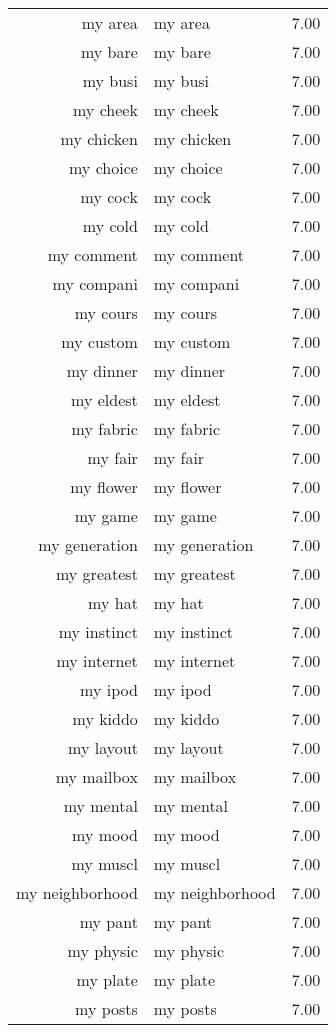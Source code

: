 \begin{table}[ht]
\begin{tabular}{rlr}
  my area & my area & 7.00 \\ 
  my bare & my bare & 7.00 \\ 
  my busi & my busi & 7.00 \\ 
  my cheek & my cheek & 7.00 \\ 
  my chicken & my chicken & 7.00 \\ 
  my choice & my choice & 7.00 \\ 
  my cock & my cock & 7.00 \\ 
  my cold & my cold & 7.00 \\ 
  my comment & my comment & 7.00 \\ 
  my compani & my compani & 7.00 \\ 
  my cours & my cours & 7.00 \\ 
  my custom & my custom & 7.00 \\ 
  my dinner & my dinner & 7.00 \\ 
  my eldest & my eldest & 7.00 \\ 
  my fabric & my fabric & 7.00 \\ 
  my fair & my fair & 7.00 \\ 
  my flower & my flower & 7.00 \\ 
  my game & my game & 7.00 \\ 
  my generation & my generation & 7.00 \\ 
  my greatest & my greatest & 7.00 \\ 
  my hat & my hat & 7.00 \\ 
  my instinct & my instinct & 7.00 \\ 
  my internet & my internet & 7.00 \\ 
  my ipod & my ipod & 7.00 \\ 
  my kiddo & my kiddo & 7.00 \\ 
  my layout & my layout & 7.00 \\ 
  my mailbox & my mailbox & 7.00 \\ 
  my mental & my mental & 7.00 \\ 
  my mood & my mood & 7.00 \\ 
  my muscl & my muscl & 7.00 \\ 
  my neighborhood & my neighborhood & 7.00 \\ 
  my pant & my pant & 7.00 \\ 
  my physic & my physic & 7.00 \\ 
  my plate & my plate & 7.00 \\ 
  my posts & my posts & 7.00 \\ 

\end{tabular}
\end{table}
